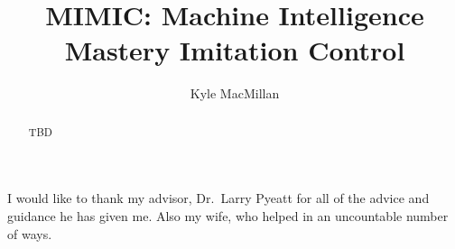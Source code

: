 \documentclass[12pt]{thesis}
\title{MIMIC: Machine Intelligence Mastery Imitation Control}
\author{Kyle MacMillan}
\begin{document}
\maketitle

\makecopyright %


\preliminaries


\begin{abstract}
TBD
\end{abstract}

\begin{acknowledgments}
I would like to thank my advisor, Dr.\ Larry Pyeatt for all of the advice and 
guidance he has given me. Also my wife, who helped in an uncountable number of 
ways.
\end{acknowledgments}

\tableofcontents

\listoftables

\listoffigures




\end{document}
